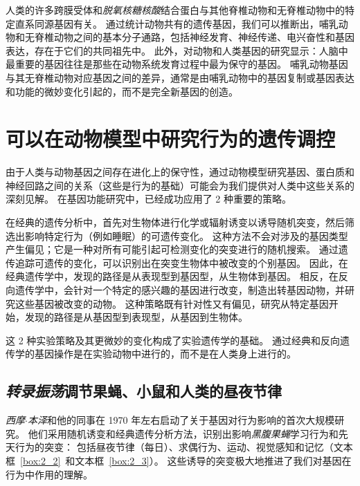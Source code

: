 人类的许多跨膜受体和\textit{脱氧核糖核酸}结合蛋白与其他脊椎动物和无脊椎动物中的特定直系同源基因有关。
通过统计动物共有的遗传基因，我们可以推断出，哺乳动物和无脊椎动物之间的基本分子通路，包括神经发育、神经传递、电兴奋性和基因表达，存在于它们的共同祖先中。
此外，对动物和人类基因的研究显示：人脑中最重要的基因往往是那些在动物系统发育过程中最为保守的基因。
哺乳动物基因与其无脊椎动物对应基因之间的差异，通常是由哺乳动物中的基因复制或基因表达和功能的微妙变化引起的，而不是完全新基因的创造。



\section{可以在动物模型中研究行为的遗传调控}

由于人类与动物基因之间存在进化上的保守性，通过动物模型研究基因、蛋白质和神经回路之间的关系（这些是行为的基础）可能会为我们提供对人类中这些关系的深刻见解。
在基因功能研究中，已经成功应用了 2 种重要的策略。


在经典的遗传分析中，首先对生物体进行化学或辐射诱变以诱导随机突变，然后筛选出影响特定行为（例如睡眠）的可遗传变化。
这种方法不会对涉及的基因类型产生偏见；它是一种对所有可能引起可检测变化的突变进行的随机搜索。 
通过遗传追踪可遗传的变化，可以识别出在突变生物体中被改变的个别基因。
因此，在经典遗传学中，发现的路径是从表现型到基因型，从生物体到基因。
相反，在反向遗传学中，会针对一个特定的感兴趣的基因进行改变，制造出转基因动物，并研究这些基因被改变的动物。
这种策略既有针对性又有偏见，研究从特定基因开始，发现的路径是从基因型到表现型，从基因到生物体。

这 2 种实验策略及其更微妙的变化构成了实验遗传学的基础。
通过经典和反向遗传学的基因操作是在实验动物中进行的，而不是在人类身上进行的。


\subsection{\textit{转录振荡}调节果蝇、小鼠和人类的昼夜节律}

\textit{西摩$\cdot$本泽}和他的同事在 1970 年左右启动了关于基因对行为影响的首次大规模研究。
他们采用随机诱变和经典遗传分析方法，识别出影响\textit{黑腹果蝇}学习行为和先天行为的突变：
包括昼夜节律（每日）、求偶行为、运动、视觉感知和记忆（文本框~\ref{box:2_2}~和文本框~\ref{box:2_3}）。
这些诱导的突变极大地推进了我们对基因在行为中作用的理解。


